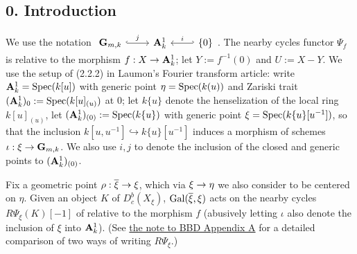 \documentclass[deligne.tex]{subfiles}
\begin{document}
\subsection*{0. Introduction}
We use the notation
$\begin{tikzcd}\GG_{m,k}\arrow[r,hook,"j"]&\A^1_k&\{0\}\arrow[l,hook',"i"']\end{tikzcd}$.
The nearby cycles functor $\Psi_f$ is relative to the morphism 
$f:X\rightarrow\mathbf{A}^1_k$; let $Y:=f^{-1}(0)$ and $U:=X-Y$.
We use the setup of (2.2.2) in Laumon's Fourier transform
article: write $\mathbf{A}^1_k=\operatorname{Spec}(k[u])$ with generic point $\eta=\operatorname{Spec}(k(u))$
and Zariski trait $(\mathbf{A}^1_k)_{0}:=\operatorname{Spec}(k[u]_{(u)})$ at 0;
let $k\{u\}$ denote the henselization of the local ring $k[u]_{(u)}$, 
let $(\mathbf{A}^1_k)_{(0)}:=\operatorname{Spec}(k\{u\})$ with generic point
$\xi=\operatorname{Spec}(k\{u\}[u^{-1}])$, so
that the inclusion $k[u,u^{-1}]\hookrightarrow k\{u\}[u^{-1}]$
induces a morphism of schemes $\iota:\xi\rightarrow\mathbf{G}_{m,k}$.
We also use $i,j$ to denote the inclusion of the closed and generic points
to $(\mathbf{A}^1_k)_{(0)}$.

Fix a geometric point $\rho:\overline\xi\rightarrow\xi$, which via $\xi\rightarrow\eta$
we also consider to be centered on $\eta$.
Given an object $K$ of $D_c^b(X_\xi)$, 
$\operatorname{Gal}(\overline\xi,\xi)$ acts on the nearby cycles
$R\Psi_\xi(K)[-1]$ of \cite[Exp. XIII]{sga7} relative to the morphism $f$ 
(abusively letting $\iota$ also denote the inclusion of $\xi$ into
$\mathbf{A}^1_k$).
(See \hyperref[BBD:AppendixA]{the note to BBD Appendix A} for a detailed
comparison of two ways of writing $R\Psi_\xi$.)
\end{document}
